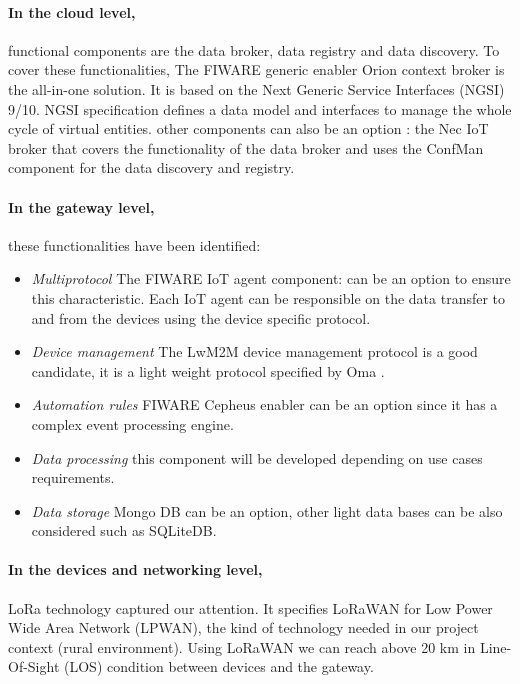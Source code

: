 \paragraph{ In the cloud level,} functional components are the data broker, data registry and data discovery.
To cover these functionalities, The FIWARE generic enabler Orion context broker is the all-in-one solution.
It is based on the Next Generic Service Interfaces (NGSI) 9/10.
NGSI specification defines a data model and interfaces to manage the whole cycle of virtual entities.  
other components can also be an option : the Nec IoT broker that covers the functionality of the data broker and uses the ConfMan component for the data discovery and registry.

\paragraph{In the gateway level,} these functionalities have been identified:

\begin{itemize}
    \item \emph{Multiprotocol}
The FIWARE IoT agent component: can be an option to ensure this characteristic. 
Each IoT agent can be responsible on the data transfer to and from the devices using the device specific protocol. 
    \item \emph{Device management}
The LwM2M device management protocol is a good candidate, it is a light weight protocol specified by Oma .
    \item \emph{Automation rules}
FIWARE Cepheus enabler can be an option since it has a complex event processing engine. 
    \item \emph{Data processing}
this component will be developed depending on use cases requirements.
    \item \emph{Data storage}
Mongo DB can be an option, other light data bases can be also considered such as SQLiteDB.
\end{itemize}

\paragraph{In the devices and networking level,} LoRa technology captured our attention. 
It specifies LoRaWAN for Low Power Wide Area Network (LPWAN), the kind of technology needed in our project context (rural environment). 
Using LoRaWAN we can reach above 20 km in Line-Of-Sight (LOS) condition between devices and the gateway. 

